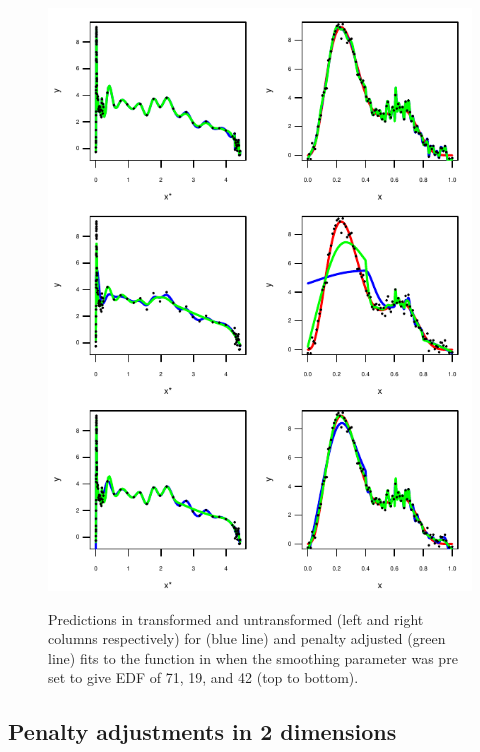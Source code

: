 \begin{figure}
\centering
\includegraphics[width=5.5in]{mds/figs/1dedfdia.pdf} \\
\caption{Predictions in transformed and untransformed (left and right columns respectively) for \tprs (blue line) and penalty adjusted \tprs (green line) fits to the function in  when the smoothing parameter was pre set to give EDF of 71, 19, and 42 (top to bottom).}
\label{1dedfdia}
\end{figure}


\subsection{Penalty adjustments in 2 dimensions}

